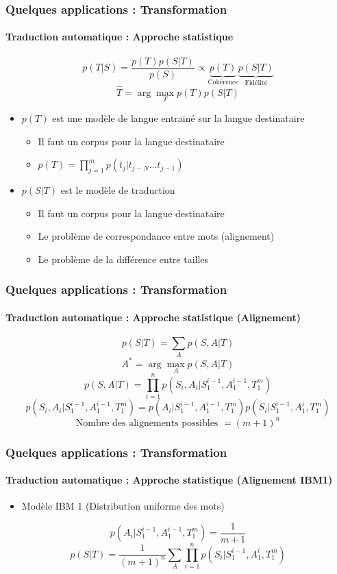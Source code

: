 \documentclass[xcolor=table]{beamer}
\begin{document}
\begin{frame}
	\frametitle{Quelques applications : Transformation}
	\framesubtitle{Traduction automatique : Approche statistique}
	\[
	p(T|S) = \frac{p(T) p(S|T)}{p(S)} \propto \underbrace{p(T)}_\text{Cohérence} \underbrace{p(S|T)}_\text{Fidélité}
	\]
	\[\hat{T} = \arg\max_{T} p(T) p(S|T)\]
	\[\]
	\begin{itemize}
		\item $p(T)$ est une modèle de langue entrainé sur la langue destinataire
		\begin{itemize}
			\item Il faut un corpus pour la langue destinataire
			\item $p(T) = \prod_{j=1}^m p(t_j|t_{j-N}\ldots t_{j-1})$
		\end{itemize}
		
		\item $p(S|T)$ est le modèle de traduction 
		\begin{itemize}
			\item Il faut un corpus pour la langue destinataire
			\item Le problème de correspondance entre mots (alignement)
			\item Le problème de la différence entre tailles
		\end{itemize}
	\end{itemize}
\end{frame}

\begin{frame}
	\frametitle{Quelques applications : Transformation}
	\framesubtitle{Traduction automatique : Approche statistique (Alignement)}
	\[p(S|T) = \sum_{A} p(S, A | T)\]
	\[A^* = \arg\max_A p(S, A | T)\]
	\[p(S, A | T) = \prod_{i=1}^{n} p(S_i, A_i | S_1^{i-1}, A_1^{i-1}, T_1^{m})\]
	\[p(S_i, A_i | S_1^{i-1}, A_1^{i-1}, T_1^{m}) = p(A_i | S_1^{i-1}, A_1^{i-1}, T_1^{m}) p(S_i | S_1^{i-1}, A_1^{i}, T_1^{m})\]
	\[ \text{Nombre des alignements possibles } = (m + 1)^n\]
\end{frame}

\begin{frame}
	\frametitle{Quelques applications : Transformation}
	\framesubtitle{Traduction automatique : Approche statistique (Alignement IBM1)}
	\begin{itemize}
		\item Modèle IBM 1 (Distribution uniforme des mots)
	\end{itemize}

	\[p(A_i | S_1^{i-1}, A_1^{i-1}, T_1^{m}) = \frac{1}{m+1}\]
	\[p(S|T) = \frac{1}{(m+1)^n} \sum_{A} \prod_{i=1}^{n} p(S_i | S_1^{i-1}, A_1^{i}, T_1^{m})\]
\end{frame}
\end{document}
